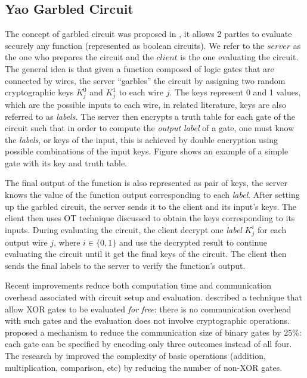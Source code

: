 \subsection{Yao Garbled Circuit}
\label{sec:yao-garbled-circuit}

\graphicspath{{Chapter6/Figs/Vector/}}
\begin{center}

\end{center}

The concept of garbled circuit was proposed in , it allows 2 parties to evaluate securely any function (represented
as boolean circuits). We refer to the \(server\) as the one who prepares the
circuit and the \(client\) is the one evaluating the circuit. The general idea
is that given a function composed of logic gates that are connected by wires,
the server ``garbles'' the circuit by assigning two random cryptographic keys
\(K_{j}^{0}\) and \(K_{j}^{1}\) to each wire \(j\). The keys represent 0 and 1
values, which are the possible inputs to each wire, in related literature, keys
are also referred to as \textit{labels.}  The server then encrypts a truth table
for each gate of the circuit such that in order to compute the \textit{output
  label } of a gate, one must know the \textit{labels}, or keys of the input,
this is achieved by double encryption using possible combinations of the input
keys. Figure \missref{} shows an example of a simple gate with its key and truth
table.

The final output of the function is also represented as pair of keys, the server
knows the value of the function output corresponding to each
\textit{label}. After setting up the garbled circuit, the server sends it to the
client and its input's keys. The client then uses OT technique discussed to
obtain the keys corresponding to its inputs. During evaluating the circuit, the
client decrypt one \textit{label} \(K_{j}^{i}\) for each output wire \(j\),
where \(i \in \{0,1\}\) and use the decrypted result to continue evaluating the
circuit until it get the final keys of the circuit. The client then sends the
final labels to the server to verify the function's output.

Recent improvements reduce both computation time and communication overhead
associated with circuit setup and evaluation. 
described a technique that allow XOR gates to be evaluated \textit{for free}:
there is no communication overhead with such gates and the evaluation does not
involve cryptographic operations.  proposed a
mechanism to reduce the communication size of binary gates by 25\%: each gate
can be specified by encoding only three outcomes instead of all four. The
research by  improved the complexity of basic
operations (addition, multiplication, comparison, etc) by reducing the number of
non-XOR gates.



